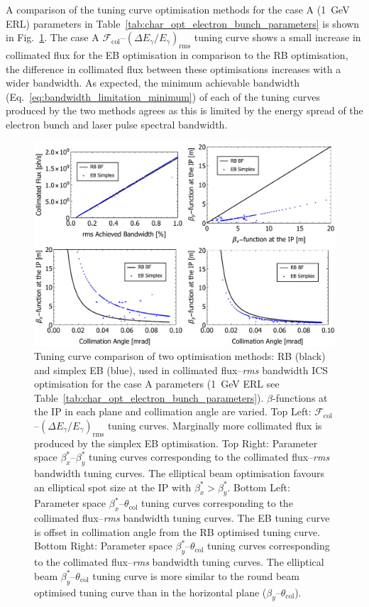 \documentclass[../main.tex]{subfiles}
\begin{document}
A comparison of the tuning curve optimisation methods for the case A (1~\si{\giga\electronvolt} ERL) parameters in Table~\ref{tab:char_opt_electron_bunch_parameters} is shown in Fig.~\ref{fig:case_A_optimisation_comparison}. The case A $\mathcal{F}_{\mathrm{col}}$--$\left(\Delta E_{\gamma}/E_{\gamma}\right)_{\mathrm{rms}}$ tuning curve shows a small increase in collimated flux for the EB optimisation in comparison to the RB optimisation, the difference in collimated flux between these optimisations increases with a wider bandwidth. As expected, the minimum achievable bandwidth (Eq.~\ref{eq:bandwidth_limitation_minimum}) of each of the tuning curves produced by the two methods agrees as this is limited by the energy spread of the electron bunch and laser pulse spectral bandwidth.
\begin{figure}[!h]
\centering
\includegraphics[width=\textwidth]{Figures/Optimisation_and_Characterisation_of_Inverse_Compton_Scattering_Sources/CaseAoptcomp.pdf}
\caption{Tuning curve comparison of two optimisation methods: RB (black) and simplex EB (blue), used in collimated flux--\textit{rms} bandwidth ICS optimisation for the case A parameters (1~\si{\giga\electronvolt}  ERL see Table~\ref{tab:char_opt_electron_bunch_parameters}). $\beta$-functions at the IP in each plane and collimation angle are varied. Top Left: $\mathcal{F}_{\mathrm{col}}$--$\left(\Delta E_{\gamma}/E_{\gamma}\right)_{\mathrm{rms}}$ tuning curves. Marginally more collimated flux is produced by the simplex EB optimisation. Top Right: Parameter space $\beta_{x}^{*}$--$\beta_{y}^{*}$ tuning curves corresponding to the collimated flux--\textit{rms} bandwidth tuning curves. The elliptical beam optimisation favours an elliptical spot size at the IP with $\beta_{x}^{*}>\beta_{y}^{*}$. Bottom Left: Parameter space $\beta_{x}^{*}$--$\theta_{\mathrm{col}}$ tuning curves corresponding to the collimated flux--\textit{rms} bandwidth tuning curves. The EB tuning curve is offset in collimation angle from the RB optimised tuning curve. Bottom Right: Parameter space $\beta_{y}^{*}$--$\theta_{\mathrm{col}}$ tuning curves corresponding to the collimated flux--\textit{rms} bandwidth tuning curves. The elliptical beam $\beta_{y}^{*}$--$\theta_{\mathrm{col}}$ tuning curve is more similar to the round beam optimised tuning curve than in the horizontal plane ($\beta_{y}$--$\theta_{\mathrm{col}}$).}
\label{fig:case_A_optimisation_comparison}
\end{figure}
\end{document}
